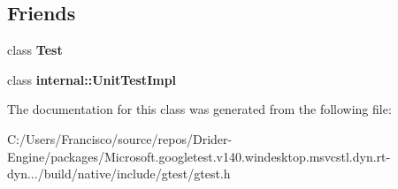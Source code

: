 \subsection*{Friends}
\begin{DoxyCompactItemize}
\item 
\mbox{\label{classtesting_1_1_test_case_a5b78b1c2e1fa07ffed92da365593eaa4}} 
class {\bfseries Test}
\item 
\mbox{\label{classtesting_1_1_test_case_acc0a5e7573fd6ae7ad1878613bb86853}} 
class {\bfseries internal\+::\+Unit\+Test\+Impl}
\end{DoxyCompactItemize}


The documentation for this class was generated from the following file\+:\begin{DoxyCompactItemize}
\item 
C\+:/\+Users/\+Francisco/source/repos/\+Drider-\/\+Engine/packages/\+Microsoft.\+googletest.\+v140.\+windesktop.\+msvcstl.\+dyn.\+rt-\/dyn.../build/native/include/gtest/gtest.\+h\end{DoxyCompactItemize}
